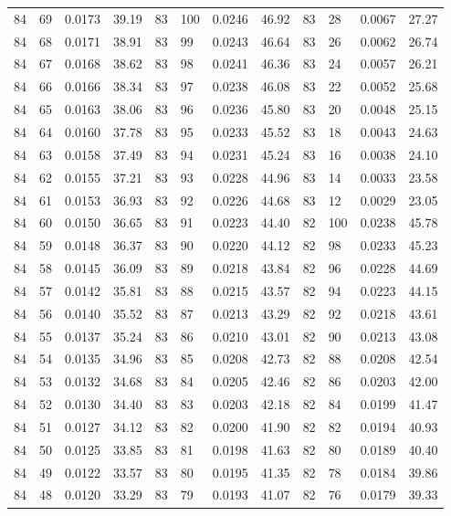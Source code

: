 \begin{tabular}{llll|llll|llll}
84 & 69 & 0.0173 & 39.19 & 83 & 100 & 0.0246 & 46.92 & 83 & 28 & 0.0067 & 27.27\\
84 & 68 & 0.0171 & 38.91 & 83 & 99 & 0.0243 & 46.64 & 83 & 26 & 0.0062 & 26.74\\
84 & 67 & 0.0168 & 38.62 & 83 & 98 & 0.0241 & 46.36 & 83 & 24 & 0.0057 & 26.21\\
84 & 66 & 0.0166 & 38.34 & 83 & 97 & 0.0238 & 46.08 & 83 & 22 & 0.0052 & 25.68\\
84 & 65 & 0.0163 & 38.06 & 83 & 96 & 0.0236 & 45.80 & 83 & 20 & 0.0048 & 25.15\\
84 & 64 & 0.0160 & 37.78 & 83 & 95 & 0.0233 & 45.52 & 83 & 18 & 0.0043 & 24.63\\
84 & 63 & 0.0158 & 37.49 & 83 & 94 & 0.0231 & 45.24 & 83 & 16 & 0.0038 & 24.10\\
84 & 62 & 0.0155 & 37.21 & 83 & 93 & 0.0228 & 44.96 & 83 & 14 & 0.0033 & 23.58\\
84 & 61 & 0.0153 & 36.93 & 83 & 92 & 0.0226 & 44.68 & 83 & 12 & 0.0029 & 23.05\\
84 & 60 & 0.0150 & 36.65 & 83 & 91 & 0.0223 & 44.40 & 82 & 100 & 0.0238 & 45.78\\
84 & 59 & 0.0148 & 36.37 & 83 & 90 & 0.0220 & 44.12 & 82 & 98 & 0.0233 & 45.23\\
84 & 58 & 0.0145 & 36.09 & 83 & 89 & 0.0218 & 43.84 & 82 & 96 & 0.0228 & 44.69\\
84 & 57 & 0.0142 & 35.81 & 83 & 88 & 0.0215 & 43.57 & 82 & 94 & 0.0223 & 44.15\\
84 & 56 & 0.0140 & 35.52 & 83 & 87 & 0.0213 & 43.29 & 82 & 92 & 0.0218 & 43.61\\
84 & 55 & 0.0137 & 35.24 & 83 & 86 & 0.0210 & 43.01 & 82 & 90 & 0.0213 & 43.08\\
84 & 54 & 0.0135 & 34.96 & 83 & 85 & 0.0208 & 42.73 & 82 & 88 & 0.0208 & 42.54\\
84 & 53 & 0.0132 & 34.68 & 83 & 84 & 0.0205 & 42.46 & 82 & 86 & 0.0203 & 42.00\\
84 & 52 & 0.0130 & 34.40 & 83 & 83 & 0.0203 & 42.18 & 82 & 84 & 0.0199 & 41.47\\
84 & 51 & 0.0127 & 34.12 & 83 & 82 & 0.0200 & 41.90 & 82 & 82 & 0.0194 & 40.93\\
84 & 50 & 0.0125 & 33.85 & 83 & 81 & 0.0198 & 41.63 & 82 & 80 & 0.0189 & 40.40\\
84 & 49 & 0.0122 & 33.57 & 83 & 80 & 0.0195 & 41.35 & 82 & 78 & 0.0184 & 39.86\\
84 & 48 & 0.0120 & 33.29 & 83 & 79 & 0.0193 & 41.07 & 82 & 76 & 0.0179 & 39.33\\

\end{tabular}

